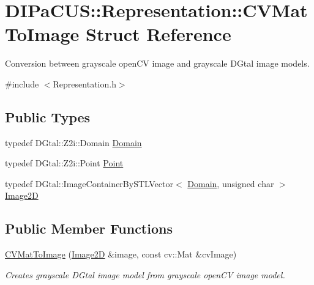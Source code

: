 \hypertarget{structDIPaCUS_1_1Representation_1_1CVMatToImage}{}\section{D\+I\+Pa\+C\+US\+:\+:Representation\+:\+:C\+V\+Mat\+To\+Image Struct Reference}
\label{structDIPaCUS_1_1Representation_1_1CVMatToImage}


Conversion between grayscale open\+CV image and grayscale D\+Gtal image models.  




{\ttfamily \#include $<$Representation.\+h$>$}

\subsection*{Public Types}
\begin{DoxyCompactItemize}
\item 
typedef D\+Gtal\+::\+Z2i\+::\+Domain \mbox{\hyperlink{structDIPaCUS_1_1Representation_1_1CVMatToImage_a5d9aec8c9bd96fa66e4f7ed3a8feac02}{Domain}}
\item 
typedef D\+Gtal\+::\+Z2i\+::\+Point \mbox{\hyperlink{structDIPaCUS_1_1Representation_1_1CVMatToImage_ac277d341558772f06247220cbdca4118}{Point}}
\item 
typedef D\+Gtal\+::\+Image\+Container\+By\+S\+T\+L\+Vector$<$ \mbox{\hyperlink{structDIPaCUS_1_1Representation_1_1CVMatToImage_a5d9aec8c9bd96fa66e4f7ed3a8feac02}{Domain}}, unsigned char $>$ \mbox{\hyperlink{structDIPaCUS_1_1Representation_1_1CVMatToImage_a3e6b8dea7273472226dfb9d161e7ee26}{Image2D}}
\end{DoxyCompactItemize}
\subsection*{Public Member Functions}
\begin{DoxyCompactItemize}
\item 
\mbox{\hyperlink{structDIPaCUS_1_1Representation_1_1CVMatToImage_a13f057de01e98b7f106360834c68d9ea}{C\+V\+Mat\+To\+Image}} (\mbox{\hyperlink{structDIPaCUS_1_1Representation_1_1CVMatToImage_a3e6b8dea7273472226dfb9d161e7ee26}{Image2D}} \&image, const cv\+::\+Mat \&cv\+Image)
\begin{DoxyCompactList}\small\item\em Creates grayscale D\+Gtal image model from grayscale open\+CV image model. \end{DoxyCompactList}\end{DoxyCompactItemize}



